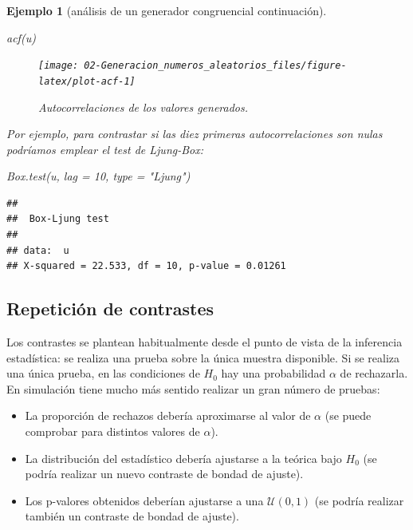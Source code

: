 \documentclass[
]{book}
\newenvironment{Shaded}{\begin{snugshade}}{\end{snugshade}}
\newcommand{\AttributeTok}[1]{\textcolor[rgb]{0.77,0.63,0.00}{#1}}
\newcommand{\DecValTok}[1]{\textcolor[rgb]{0.00,0.00,0.81}{#1}}
\newcommand{\FunctionTok}[1]{\textcolor[rgb]{0.00,0.00,0.00}{#1}}
\newcommand{\NormalTok}[1]{#1}
\newcommand{\StringTok}[1]{\textcolor[rgb]{0.31,0.60,0.02}{#1}}
\theoremstyle{break}
\newtheorem{example}{Ejemplo}[chapter]
\theoremstyle{nonumberplain}
\begin{document}
\begin{example}[análisis de un generador congruencial continuación]
\begin{Shaded}
\begin{Highlighting}[]
\FunctionTok{acf}\NormalTok{(u)}
\end{Highlighting}
\end{Shaded}

\begin{figure}[!htb]

{\centering \texttt{[image: 02-Generacion\_numeros\_aleatorios\_files/figure-latex/plot-acf-1]} 

}

\caption{Autocorrelaciones de los valores generados.}\label{fig:plot-acf}
\end{figure}

Por ejemplo, para contrastar si las diez primeras autocorrelaciones son nulas podríamos emplear el test de Ljung-Box:

\begin{Shaded}
\begin{Highlighting}[]
\FunctionTok{Box.test}\NormalTok{(u, }\AttributeTok{lag =} \DecValTok{10}\NormalTok{, }\AttributeTok{type =} \StringTok{"Ljung"}\NormalTok{)}
\end{Highlighting}
\end{Shaded}

\begin{verbatim}
## 
##  Box-Ljung test
## 
## data:  u
## X-squared = 22.533, df = 10, p-value = 0.01261
\end{verbatim}

\end{example}

\hypertarget{repeticiuxf3n-de-contrastes}{%
\subsection{Repetición de contrastes}\label{repeticiuxf3n-de-contrastes}}

Los contrastes se plantean habitualmente desde el punto de vista de la inferencia estadística: se realiza una prueba sobre la única muestra disponible.
Si se realiza una única prueba, en las condiciones de \(H_0\) hay una probabilidad \(\alpha\) de rechazarla.
En simulación tiene mucho más sentido realizar un gran número de pruebas:

\begin{itemize}
\item
  La proporción de rechazos debería aproximarse al valor de
  \(\alpha\) (se puede comprobar para distintos valores de \(\alpha\)).
\item
  La distribución del estadístico debería ajustarse a la teórica
  bajo \(H_0\) (se podría realizar un nuevo contraste de bondad
  de ajuste).
\item
  Los p-valores obtenidos deberían ajustarse a una
  \(\mathcal{U}\left(0,1\right)\) (se podría realizar también un
  contraste de bondad de ajuste).
\end{itemize}
\end{document}
